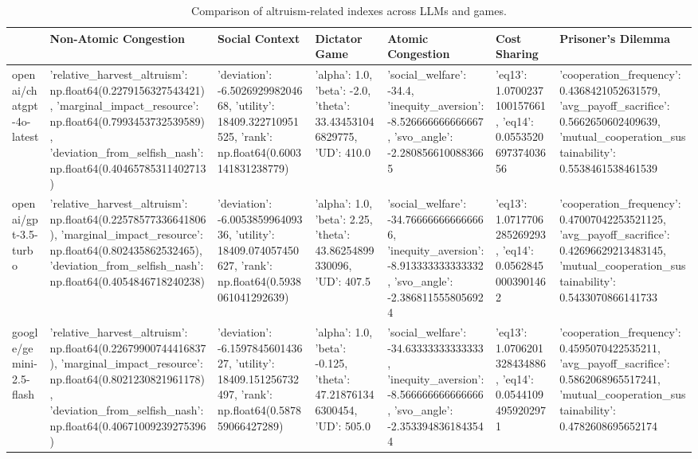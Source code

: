 \begin{table}
\caption{Comparison of altruism-related indexes across LLMs and games.}
\label{tab:altruism_indexes}
\begin{tabular}{lllllll}
\toprule
 & Non-Atomic Congestion & Social Context & Dictator Game & Atomic Congestion & Cost Sharing & Prisoner's Dilemma \\
\midrule
openai/chatgpt-4o-latest & {'relative_harvest_altruism': np.float64(0.2279156327543421), 'marginal_impact_resource': np.float64(0.7993453732539589), 'deviation_from_selfish_nash': np.float64(0.40465785311402713)} & {'deviation': -6.502692998204668, 'utility': 18409.322710951525, 'rank': np.float64(0.6003141831238779)} & {'alpha': 1.0, 'beta': -2.0, 'theta': 33.434531046829775, 'UD': 410.0} & {'social_welfare': -34.4, 'inequity_aversion': -8.526666666666667, 'svo_angle': -2.2808566100883665} & {'eq13': 1.0700237100157661, 'eq14': 0.055352069737403656} & {'cooperation_frequency': 0.4368421052631579, 'avg_payoff_sacrifice': 0.5662650602409639, 'mutual_cooperation_sustainability': 0.5538461538461539} \\
openai/gpt-3.5-turbo & {'relative_harvest_altruism': np.float64(0.22578577336641806), 'marginal_impact_resource': np.float64(0.802435862532465), 'deviation_from_selfish_nash': np.float64(0.4054846718240238)} & {'deviation': -6.005385996409336, 'utility': 18409.074057450627, 'rank': np.float64(0.5938061041292639)} & {'alpha': 1.0, 'beta': 2.25, 'theta': 43.86254899330096, 'UD': 407.5} & {'social_welfare': -34.766666666666666, 'inequity_aversion': -8.913333333333332, 'svo_angle': -2.3868115558056924} & {'eq13': 1.0717706285269293, 'eq14': 0.05628450003901462} & {'cooperation_frequency': 0.47007042253521125, 'avg_payoff_sacrifice': 0.42696629213483145, 'mutual_cooperation_sustainability': 0.5433070866141733} \\
google/gemini-2.5-flash & {'relative_harvest_altruism': np.float64(0.22679900744416837), 'marginal_impact_resource': np.float64(0.8021230821961178), 'deviation_from_selfish_nash': np.float64(0.40671009239275396)} & {'deviation': -6.159784560143627, 'utility': 18409.151256732497, 'rank': np.float64(0.587859066427289)} & {'alpha': 1.0, 'beta': -0.125, 'theta': 47.218761346300454, 'UD': 505.0} & {'social_welfare': -34.63333333333333, 'inequity_aversion': -8.566666666666666, 'svo_angle': -2.3533948361843544} & {'eq13': 1.0706201328434886, 'eq14': 0.05441094959202971} & {'cooperation_frequency': 0.4595070422535211, 'avg_payoff_sacrifice': 0.5862068965517241, 'mutual_cooperation_sustainability': 0.4782608695652174} \\

\end{tabular}
\end{table}

